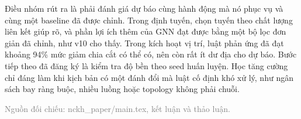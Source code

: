 Điều nhóm rút ra là phải đánh giá dự báo cùng hành động mà nó phục vụ và cùng một baseline đã được chỉnh. Trong định tuyến, chọn tuyến theo chất lượng liên kết giúp rõ, và phần lợi ích thêm của GNN đạt được bằng một bộ lọc đơn giản đã chỉnh, như v10 cho thấy. Trong kích hoạt vị trí, luật phản ứng đã đạt khoảng 94\% mức giảm chia cắt có thể có, nên còn rất ít dư địa cho dự báo. Bước tiếp theo đã đăng ký là kiểm tra độ bền theo seed huấn luyện. Học tăng cường chỉ đáng làm khi kịch bản có một đánh đổi mà luật cố định khó xử lý, như ngân sách bay ràng buộc, nhiều luồng hoặc topology không phải chuỗi.

{\small\textcolor{gray}{Nguồn đối chiếu: nckh\_paper/main.tex, kết luận và thảo luận.}}

